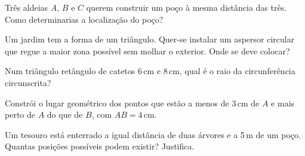 \documentclass[12pt]{article}
\begin{document}
\begin{exercicios}
  \item Três aldeias $A$, $B$ e $C$ querem construir um poço à mesma distância das três. Como determinarias a localização do poço?
  \item Um jardim tem a forma de um triângulo. Quer-se instalar um aspersor circular que regue a maior zona possível sem molhar o exterior. Onde se deve colocar?
  \item Num triângulo retângulo de catetos 6\,cm e 8\,cm, qual é o raio da circunferência circunscrita?
  \item Constrói o lugar geométrico dos pontos que estão a menos de 3\,cm de $A$ e mais perto de $A$ do que de $B$, com $AB = 4$\,cm.
  \item Um tesouro está enterrado a igual distância de duas árvores e a 5\,m de um poço. Quantas posições possíveis podem existir? Justifica.
\end{exercicios}
\end{document}
